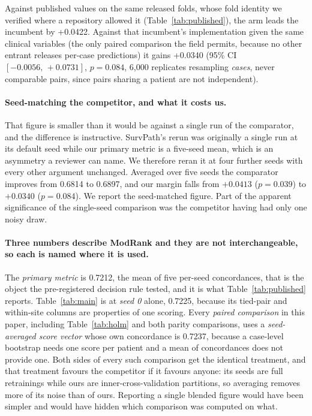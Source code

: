 \documentclass[11pt]{article}
\begin{document}
Against published values on the same released folds, whose fold identity we verified where a
repository allowed it (Table~\ref{tab:published}), the arm leads the incumbent by
+0.0422. Against that incumbent's implementation given the same clinical variables (the only paired comparison the field permits, because no other entrant releases per-case predictions)
it gains +0.0340 (95\% CI $[-0.0056,\,+0.0731]$, $p=0.084$, 6{,}000 replicates resampling
\emph{cases}, never comparable pairs, since pairs sharing a patient are not independent).

\paragraph{Seed-matching the competitor, and what it costs us.} That figure is smaller than it
would be against a single run of the comparator, and the difference is instructive. SurvPath's
rerun was originally a single run at its default seed while our primary metric is a five-seed mean,
which is an asymmetry a reviewer can name. We therefore reran it at four further seeds with every
other argument unchanged. Averaged over five seeds the comparator improves from 0.6814 to
0.6897, and our margin falls from $+0.0413$ ($p=0.039$) to $+0.0340$ ($p=0.084$). We
report the seed-matched figure. Part of the apparent significance of the single-seed
comparison was the competitor having had only one noisy draw.

\paragraph{Three numbers describe ModRank and they are not interchangeable, so each is named where it is used.} The \emph{primary metric} is 0.7212, the mean of five per-seed concordances, that is the
object the pre-registered decision rule tested, and it is what Table~\ref{tab:published} reports.
Table~\ref{tab:main} is at \emph{seed 0} alone, 0.7225, because its tied-pair and within-site
columns are properties of one scoring. Every \emph{paired comparison} in this paper, including
Table~\ref{tab:holm} and both parity comparisons, uses a \emph{seed-averaged score vector} whose own
concordance is 0.7237, because a case-level bootstrap needs one score per patient and a mean of
concordances does not provide one. Both sides of every such comparison get the identical treatment,
and that treatment favours the competitor if it favours anyone: its seeds are full retrainings while
ours are inner-cross-validation partitions, so averaging removes more of its noise than of ours.
Reporting a single blended figure would have been simpler and would have hidden which comparison was
computed on what.
\end{document}
